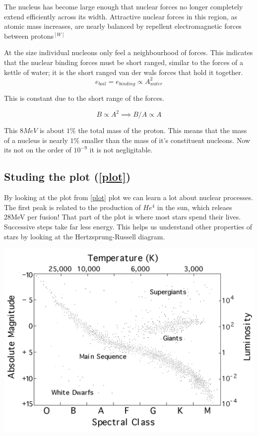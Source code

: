 \documentclass[english, 11pt]{article}
\begin{document}
      \begin{defn}\label{sat}
        The nucleus has become large enough that nuclear forces no longer completely extend efficiently across its width. Attractive nuclear forces in this region, as atomic mass increases, are nearly balanced by repellent electromagnetic forces between protons$^{[W]}$
      \end{defn}
     
      At the size individual nucleons only feel a neighbourhood of forces. This indicates that the nuclear binding forces must be short ranged, similar to the forces of a kettle of water; it is the short ranged van der wals forces that hold it together. 
      \\ 
      \[ e_{boil} = e_{binding} \propto A^2_{water} \]

      This is constant due to the short range of the forces. 

      \[ B \propto A^2 \implies B/A  \propto A\]

      This $8 MeV$ is about $1\%$ the total mass of the proton. This means that the mass of a nucleus is nearly $1\%$ smaller than the mass of it's constituent nucleons. Now its not on the order of $10^{-9}$ it is not negligitable. 

      \subsection{Studing the plot (\ref{plot})}

      By looking at the plot from \ref{plot} plot we can learn a lot about nuclear processes. 
      The first peak is related to the production of $He^{4}$ in the sun, which releaes 28MeV per fusion! That part of the plot is where most stars spend their lives. Successive steps take far less energy. This helps us understand other properties of stars by looking at the Hertzsprung-Russell diagram. 

      \begin{center}\label{rus}
         \includegraphics[scale=0.23]{../img/rus}
      \end{center}
\end{document}
